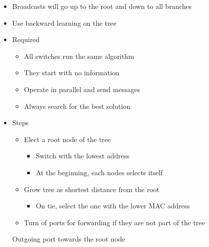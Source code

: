 \begin{itemize}
\begin{itemize}
\begin{itemize}
\begin{itemize}
                            \item Broadcasts will go up to the root and down to all branches
                            \item Use backward learning on the tree
                        \end{itemize}
                        \begin{itemize}
                            \item Required
                                \begin{itemize}
                                    \item All switches run the same algorithm
                                    \item They start with no information
                                    \item Operate in parallel and send messages
                                    \item Always search for the best solution
                                \end{itemize}
                            \item Steps
                                \begin{itemize}
                                    \item Elect a root node of the tree
                                        \begin{itemize}
                                            \item Switch with the lowest address
                                            \item At the beginning, each nodes selects itself
                                        \end{itemize}
                                    \item Grow tree as shortest distance from the root
                                        \begin{itemize}
                                            \item On tie, select the one with the lower MAC address
                                        \end{itemize}
                                    \item Turn of ports for forwarding if they are not part of the tree
                                \end{itemize}
                             Outgoing port towards the root node

\end{itemize}
\end{itemize}
\end{itemize}
\end{itemize}
